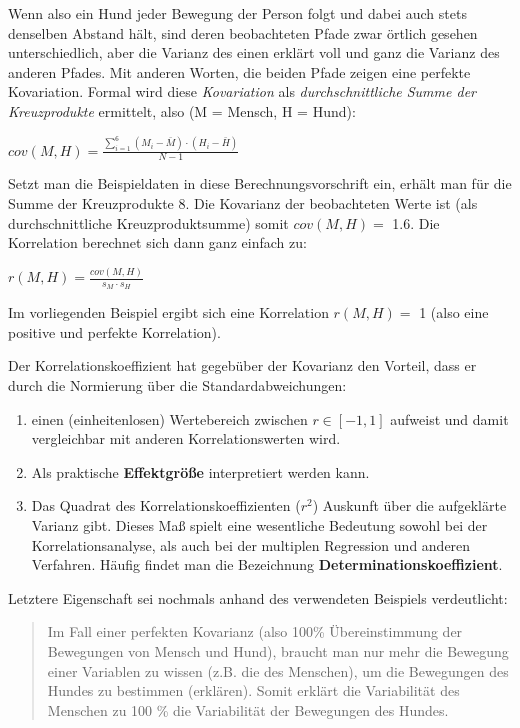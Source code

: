 \documentclass[]{article}
\providecommand{\tightlist}{%
  \setlength{\itemsep}{0pt}\setlength{\parskip}{0pt}}
\begin{document}
Wenn also ein Hund jeder Bewegung der Person folgt und dabei auch stets denselben Abstand hält, sind deren beobachteten Pfade zwar örtlich gesehen unterschiedlich, aber die Varianz des einen erklärt voll und ganz die Varianz des anderen Pfades. Mit anderen Worten, die beiden Pfade zeigen eine perfekte Kovariation. Formal wird diese \emph{Kovariation} als \emph{durchschnittliche Summe der Kreuzprodukte} ermittelt, also (M = Mensch, H = Hund):

\(cov(M, H) = \frac{\sum_{i=1}^{6} (M_i - \bar{M}) \cdot (H_i - \bar{H})}{N-1}\)

Setzt man die Beispieldaten in diese Berechnungsvorschrift ein, erhält man für die Summe der Kreuzprodukte 8. Die Kovarianz der beobachteten Werte ist (als durchschnittliche Kreuzproduktsumme) somit \(cov(M,H) =\) 1.6. Die Korrelation berechnet sich dann ganz einfach zu:

\(r(M, H) = \frac{cov(M,H)}{s_M \cdot s_H}\)

Im vorliegenden Beispiel ergibt sich eine Korrelation \(r(M,H) =\) 1 (also eine positive und perfekte Korrelation).

Der Korrelationskoeffizient hat gegebüber der Kovarianz den Vorteil, dass er durch die Normierung über die Standardabweichungen:

\begin{enumerate}
\def\labelenumi{\arabic{enumi}.}
\tightlist
\item
  einen (einheitenlosen) Wertebereich zwischen \(r \in [-1, 1]\) aufweist und damit vergleichbar mit anderen Korrelationswerten wird.
\item
  Als praktische \textbf{Effektgröße} interpretiert werden kann.
\item
  Das Quadrat des Korrelationskoeffizienten (\(r^2\)) Auskunft über die aufgeklärte Varianz gibt. Dieses Maß spielt eine wesentliche Bedeutung sowohl bei der Korrelationsanalyse, als auch bei der multiplen Regression und anderen Verfahren. Häufig findet man die Bezeichnung \textbf{Determinationskoeffizient}.
\end{enumerate}

Letztere Eigenschaft sei nochmals anhand des verwendeten Beispiels verdeutlicht:

\begin{quote}
Im Fall einer perfekten Kovarianz (also 100\% Übereinstimmung der Bewegungen von Mensch und Hund), braucht man nur mehr die Bewegung einer Variablen zu wissen (z.B. die des Menschen), um die Bewegungen des Hundes zu bestimmen (erklären). Somit erklärt die Variabilität des Menschen zu 100 \% die Variabilität der Bewegungen des Hundes.
\end{quote}
\end{document}
